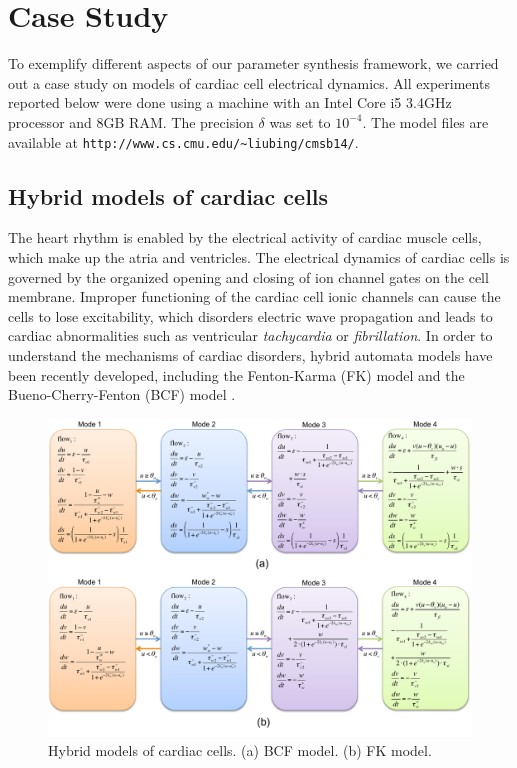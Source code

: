 \section{Case Study}

To exemplify different aspects of our parameter synthesis framework, we carried out a case study on
models of cardiac cell electrical dynamics. All experiments reported below were done
using a machine with an Intel Core i5 3.4GHz processor and 8GB RAM. The precision $\delta$
was set to $10^{-4}$. The model files are available at \verb#http://www.cs.cmu.edu/~liubing/cmsb14/#.


\subsection{Hybrid models of cardiac cells}
The heart rhythm is enabled by the electrical activity of cardiac muscle cells, which make up the atria and ventricles. The electrical dynamics of cardiac cells is governed by the organized opening and closing of ion channel gates on the cell membrane. Improper functioning of the cardiac cell ionic channels can cause the cells to lose excitability, which disorders electric wave propagation and leads to cardiac abnormalities such as ventricular \textit{tachycardia} or \textit{fibrillation}. In order to understand the mechanisms of cardiac disorders,
hybrid automata models have been recently developed, including the Fenton-Karma (FK) model \cite{fenton98} and the Bueno-Cherry-Fenton (BCF) model \cite{orovio08}.
\begin{figure}[t]
\centering
\includegraphics[scale=0.52]{fig-cardiac-new}
\caption{Hybrid models of cardiac cells. (a) BCF model. (b) FK model.}
\label{model}
\end{figure}
